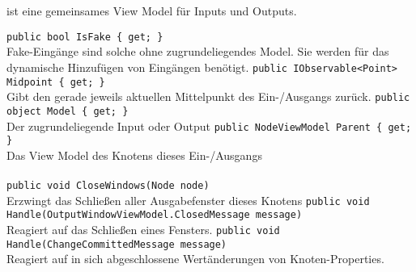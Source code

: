 \paragraph{}~\\
 ist eine gemeinsames View Model für Inputs und Outputs.
\begin{itemize}
	\add \verb!public bool IsFake { get; }! \\
	Fake-Eingänge sind solche ohne zugrundeliegendes Model. Sie werden für das dynamische Hinzufügen von Eingängen benötigt.
	\add \verb!public IObservable<Point> Midpoint { get; }! \\
	Gibt den gerade jeweils aktuellen Mittelpunkt des Ein-/Ausgangs zurück.
	\add \verb!public object Model { get; }! \\
	Der zugrundeliegende Input oder Output
	\add \verb!public NodeViewModel Parent { get; }! \\
	Das View Model des Knotens dieses Ein-/Ausgangs
\end{itemize}

\paragraph{}
\begin{itemize}
	\add \verb!public void CloseWindows(Node node)! \\
	Erzwingt das Schließen aller Ausgabefenster dieses Knotens
	\add \verb!public void Handle(OutputWindowViewModel.ClosedMessage message)! \\
	Reagiert auf das Schließen eines Fensters.
	\verb!public void Handle(ChangeCommittedMessage message)! \\
	Reagiert auf in sich abgeschlossene Wertänderungen von Knoten-Properties.
\end{itemize}

